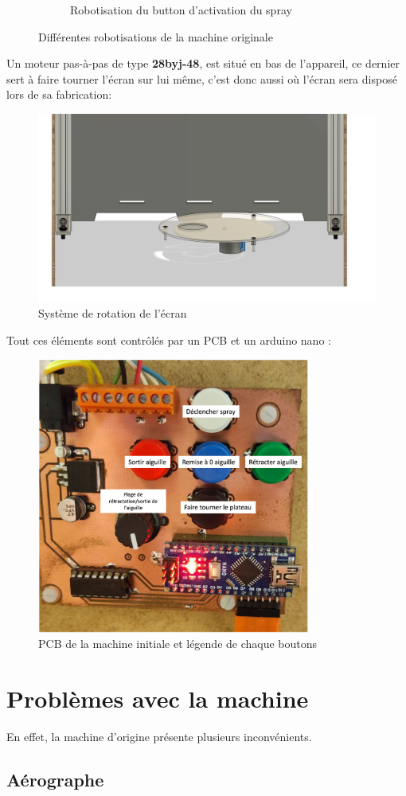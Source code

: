 \begin{figure}[H]
\begin{subfigure}{.65\textwidth}
    \caption{Robotisation du button d'activation du spray}
    \label{fig:robot_spray}
  \end{subfigure}
  \caption{Différentes robotisations de la machine originale}
  \label{fig:robotisations_aerographe}
\end{figure}

Un moteur pas-à-pas de type \textbf{28byj-48}, est situé en bas de l'appareil, ce dernier sert à faire tourner l'écran sur lui même,
c'est donc aussi où l'écran sera disposé lors de sa fabrication:
\begin{figure}[H]
  \centering
  \includegraphics[width = \textwidth]{assets/figures/situation_initiale/rotation_ecran_initiale.png}
  \caption[Rotation écran initiale]{Système de rotation de l'écran}

\end{figure}

\newpage
Tout ces éléments sont contrôlés par un PCB et un arduino nano :
\begin{figure}[H]
  \centering
  \includegraphics[width = 0.8\textwidth]{assets/figures/situation_initiale/PCB_machine_originale.png}
  \caption[PCB machine initiale]{PCB de la machine initiale et légende de chaque boutons}\label{PCB_machine_initial}
\end{figure}

\section{Problèmes avec la machine}
En effet, la machine d'origine présente plusieurs inconvénients.
\subsection{Aérographe}